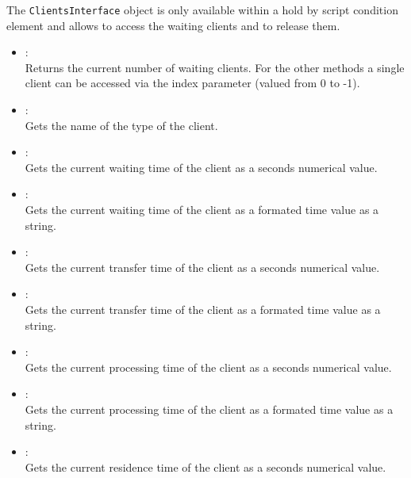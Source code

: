 The \texttt{ClientsInterface} object is only available within a hold by script condition element
and allows to access the waiting clients and to release them.

\begin{itemize}

\item
{}:\\
Returns the current number of waiting clients. For the other
methods a single client can be accessed via the index parameter
(valued from 0 to -1).

\item
{}:\\
Gets the name of the type of the client.

\item
{}:\\
Gets the current waiting time of the client as a seconds numerical value.

\item
{}:\\
Gets the current waiting time of the client as a formated time value as a string.

\item
{}:\\
Gets the current transfer time of the client as a seconds numerical value.

\item
{}:\\
Gets the current transfer time of the client as a formated time value as a string.

\item
{}:\\
Gets the current processing time of the client as a seconds numerical value.

\item
{}:\\
Gets the current processing time of the client as a formated time value as a string.

\item
{}:\\
Gets the current residence time of the client as a seconds numerical value.


\end{itemize}
